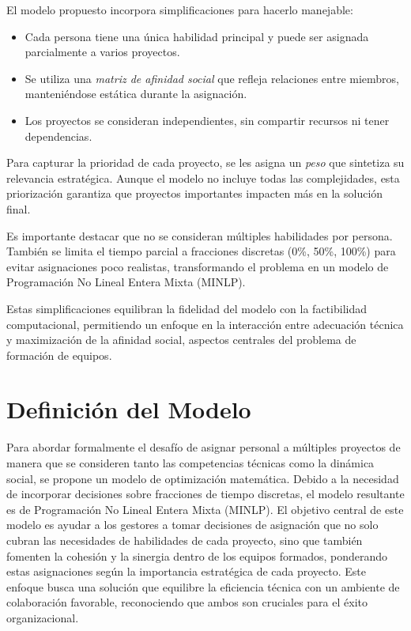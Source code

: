 \documentclass[conference]{IEEEtran}
\begin{document}
El modelo propuesto incorpora simplificaciones para hacerlo manejable:
\begin{itemize}
    \item Cada persona tiene una única habilidad principal y puede ser asignada parcialmente a varios proyectos.
    \item Se utiliza una \textit{matriz de afinidad social} \cite{gutierrez2016multiple} que refleja relaciones entre miembros, manteniéndose estática durante la asignación.
    \item Los proyectos se consideran independientes, sin compartir recursos ni tener dependencias.
\end{itemize}

Para capturar la prioridad de cada proyecto, se les asigna un \textit{peso} que sintetiza su relevancia estratégica. Aunque el modelo no incluye todas las complejidades, esta priorización garantiza que proyectos importantes impacten más en la solución final.

Es importante destacar que no se consideran múltiples habilidades por persona. También se limita el tiempo parcial a fracciones discretas (0\%, 50\%, 100\%) para evitar asignaciones poco realistas, transformando el problema en un modelo de Programación No Lineal Entera Mixta (MINLP).

Estas simplificaciones equilibran la fidelidad del modelo con la factibilidad computacional, permitiendo un enfoque en la interacción entre adecuación técnica y maximización de la afinidad social, aspectos centrales del problema de formación de equipos.

\section{Definición del Modelo}

Para abordar formalmente el desafío de asignar personal a múltiples proyectos de manera que se consideren tanto las competencias técnicas como la dinámica social, se propone un modelo de optimización matemática. Debido a la necesidad de incorporar decisiones sobre fracciones de tiempo discretas, el modelo resultante es de Programación No Lineal Entera Mixta (MINLP). El objetivo central de este modelo es ayudar a los gestores a tomar decisiones de asignación que no solo cubran las necesidades de habilidades de cada proyecto, sino que también fomenten la cohesión y la sinergia dentro de los equipos formados, ponderando estas asignaciones según la importancia estratégica de cada proyecto. Este enfoque busca una solución que equilibre la eficiencia técnica con un ambiente de colaboración favorable, reconociendo que ambos son cruciales para el éxito organizacional.
\end{document}

